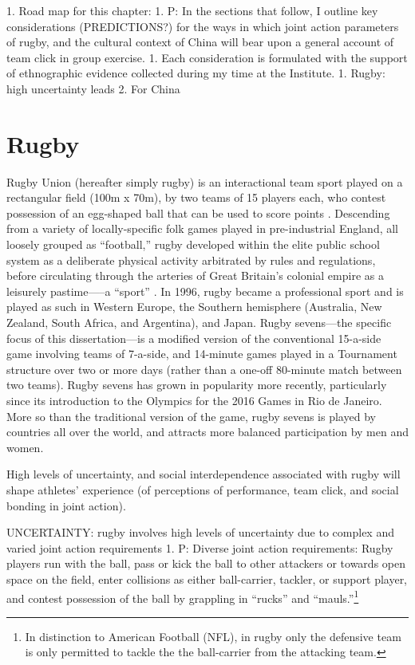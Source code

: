 \begin{CJK}{UTF8}{gbsn}
    1. Road map for this chapter:
        1. P: In the sections that follow, I outline key considerations (PREDICTIONS?) for the ways in which joint action parameters of rugby, and the cultural context of China will bear upon a general account of team click in group exercise.
            1. Each consideration is formulated with the support of ethnographic evidence collected during my time at the Institute.
        1. Rugby: high uncertainty leads
        2. For China




\section{Rugby}
Rugby Union (hereafter simply rugby) is an interactional team sport played on a rectangular field (100m x 70m), by two teams of 15 players each, who contest possession of an egg-shaped ball that can be used to score points \citep{IRB2014}.  Descending from a variety of locally-specific folk games played in pre-industrial England, all loosely grouped as ``football,'' rugby developed within the elite public school system as a deliberate physical activity arbitrated by rules and regulations, before circulating through the arteries of Great Britain's colonial empire as a leisurely pastime—--a ``sport'' \citep{Dunning2005}.  In 1996, rugby became a professional sport and is played as such in Western Europe, the Southern hemisphere (Australia, New Zealand, South Africa, and Argentina), and Japan. Rugby sevens---the specific focus of this dissertation---is a modified version of the conventional 15-a-side game involving teams of 7-a-side, and 14-minute games played in a Tournament structure over two or more days (rather than a one-off 80-minute match between two teams).  Rugby sevens has grown in popularity more recently, particularly since its introduction to the Olympics for the 2016 Games in Rio de Janeiro.  More so than the traditional version of the game, rugby sevens is played by countries all over the world, and attracts more balanced participation by men and women.

High levels of uncertainty, and social interdependence associated with rugby will shape athletes’ experience (of perceptions of performance, team click, and social bonding in joint action).

UNCERTAINTY: rugby involves high levels of uncertainty due to complex and varied joint action requirements
                1. P: Diverse joint action requirements:
Rugby players run with the ball, pass or kick the ball to other attackers or towards open space on the field, enter collisions as either ball-carrier, tackler, or support player, and contest possession of the ball by grappling in ``rucks'' and ``mauls.''\footnote{In distinction to American Football (NFL), in rugby only the defensive team is only permitted to tackle the the ball-carrier from the attacking team.}


\end{CJK}
